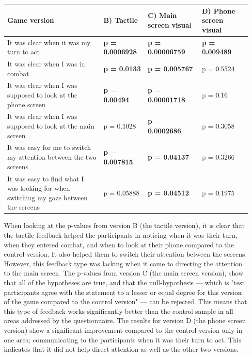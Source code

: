 \begin{center}
  \begin{tabular*}{\textwidth}{ | p{4.84cm} | p{2.5cm} | p{2.5cm} | p{2.5cm} |}
    \hline
    Game version & B) Tactile & C) Main screen visual & D) Phone screen visual \\ \hline
    It was clear when it  was my turn to act & \textbf{p = 0.0006928} & \textbf{p = 0.00006759} & \textbf{p = 0.009489} \\ \hline
    It was clear when I was in combat & \textbf{p = 0.0133} & \textbf{p = 0.005767} & p = 0.5524 \\ \hline
    It was clear when I was supposed to look at the phone screen & \textbf{p = 0.00494} & \textbf{p = 0.00001718} & p = 0.16 \\ \hline
    It was clear when I was supposed to look at the main screen & p = 0.1028 & \textbf{p = 0.0002686} & p = 0.3058 \\ \hline
    It was easy for me to switch my attention between the two screens & \textbf{p = 0.007815} & \textbf{p = 0.04137} & p = 0.3266 \\ \hline
    It was easy to find what I was looking for when switching my gaze between the screens & p = 0.05888 & \textbf{p = 0.04512} & p = 0.1975 \\
    \hline
  \end{tabular*}\label{tbl:p_table}
\end{center}

When looking at the p-values from version B (the tactile version), it is clear that the tactile feedback helped the participants in noticing when it was their turn, when they entered combat, and when to look at their phone compared to the control version. It also helped them to switch their attention between the screens. However, this feedback type was lacking when it came to directing the attention to the main screen. 
The p-values from version C (the main screen version), show that all of the hypotheses are true, and that the null-hypothesis --- which is "test participants agree with the statement to a lesser or equal degree for this version of the game compared to the control version" --- can be rejected. This means that this type of feedback works significantly better than the control sample in all areas addressed by the questionnaire.
The results for version D (the phone screen version) show a significant improvement compared to the control version only in one area; communicating to the participants when it was their turn to act. This indicates that it did not help direct attention as well as the other two versions. 

